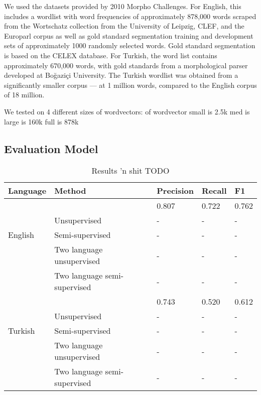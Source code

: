 \documentclass[11pt,twocolumn]{article}
\begin{document}
We used the datasets provided by 2010 Morpho Challenges. For English, this includes
a wordlist with word frequencies of approximately 878,000 words scraped from the
Wortschatz collection from the University of Leipzig, CLEF, and the Europarl corpus
as well as gold standard segmentation training and development sets of approximately 
1000 randomly selected words. Gold standard segmentation is based on the CELEX database.
For Turkish, the word list contains approximately 670,000 words, with gold standards
from a morphological parser developed at Boğaziçi University. The Turkish wordlist
was obtained from a significantly smaller corpus --- at 1 million words, compared
to the English corpus of 18 million.

We tested on 4 different sizes of wordvectors:
of wordvector 
small is 2.5k
med is 
large is 160k
full is 878k

\subsection{Evaluation Model}

\begin{table*}
    \begin{center}
        \begin{tabular}{ | l | l | l | l | l |}
            \hline
            Language & Method & Precision & Recall & F1 \\ \hline
                     & \citeauthor{Narasimhan15} & 0.807 & 0.722 & 0.762 \\ 
                     & Unsupervised & -  & - & - \\ 
            English & Semi-supervised & - & - & - \\ 
                    & Two language unsupervised & - & - & - \\ 
                    & Two language semi-supervised & - & - & - \\ \hline
                    & \citeauthor{Narasimhan15} & 0.743 & 0.520 & 0.612 \\ 
                    & Unsupervised & - & - & - \\ 
            Turkish & Semi-supervised & - & - & -  \\ 
                    & Two language unsupervised  & - & - & -  \\ 
                    & Two language semi-supervised  & - & - & -  \\ \hline
        \end{tabular}
        \caption{Results 'n shit TODO}
    \end{center}
\end{table*}
\end{document}
